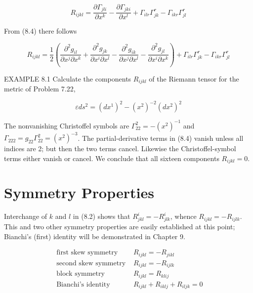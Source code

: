 \documentclass[10pt]{article}
\begin{document}
\begin{equation*}
R_{i j k l}=\frac{\partial \Gamma_{j l i}}{\partial x^{k}}-\frac{\partial \Gamma_{j k i}}{\partial x^{l}}+\Gamma_{i l r} \Gamma_{j k}^{r}-\Gamma_{i k r} \Gamma_{j l}^{r} \tag{8.4}
\end{equation*}


From (8.4) there follows


\begin{equation*}
R_{i j k l}=\frac{1}{2}\left(\frac{\partial^{2} g_{i l}}{\partial x^{j} \partial x^{k}}+\frac{\partial^{2} g_{j k}}{\partial x^{i} \partial x^{l}}-\frac{\partial^{2} g_{i k}}{\partial x^{j} \partial x^{l}}-\frac{\partial^{2} g_{j l}}{\partial x^{i} \partial x^{k}}\right)+\Gamma_{i l r} \Gamma_{j k}^{r}-\Gamma_{i k r} \Gamma_{j l}^{r} \tag{8.5}
\end{equation*}


EXAMPLE 8.1 Calculate the components $R_{i j k l}$ of the Riemann tensor for the metric of Problem 7.22,

$$
\varepsilon d s^{2}=\left(d x^{1}\right)^{2}-\left(x^{2}\right)^{-2}\left(d x^{2}\right)^{2}
$$

The nonvanishing Christoffel symbols are $\Gamma_{22}^{2}=-\left(x^{2}\right)^{-1}$ and $\Gamma_{222}=g_{22} \Gamma_{22}^{2}=\left(x^{2}\right)^{-3}$. The partial-derivative terms in (8.4) vanish unless all indices are 2; but then the two terms cancel. Likewise the Christoffel-symbol terms either vanish or cancel. We conclude that all sixteen components $R_{i j k l}=0$.

\section*{Symmetry Properties}
Interchange of $k$ and $l$ in (8.2) shows that $R_{j k l}^{i}=-R_{j l k}^{i}$, whence $R_{i j k l}=-R_{i j l k}$. This and two other symmetry properties are easily established at this point; Bianchi's (first) identity will be demonstrated in Chapter 9.


\begin{align*}
\text { first skew symmetry } & R_{i j k l}=-R_{j i k l} \\
\text { second skew symmetry } & R_{i j k l}=-R_{i j l k}  \tag{8.6}\\
\text { block symmetry } & R_{i j k l}=R_{k l i j} \\
\text { Bianchi's identity } & R_{i j k l}+R_{i k l j}+R_{i l j k}=0
\end{align*}
\end{document}
